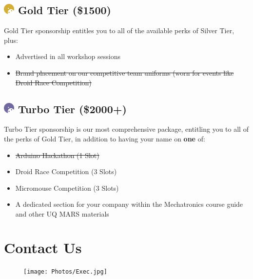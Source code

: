 \documentclass[a4paper,12pt]{report}
\begin{document}
\subsection*{
    \includegraphics[width=1em]{../assets/Sponsor Icons/Gold}
    \textcolor{sponsor_gold}{Gold Tier (\$1500)}
}
Gold Tier sponsorship entitles you to all of the available perks of Silver Tier, plus:
\begin{itemize}
    \item Advertised in all workshop sessions
    \item \st{Brand placement on our competitive team uniforms (worn for events like Droid Race Competition)}
\end{itemize}

\subsection*{
    \includegraphics[width=1em]{../assets/Sponsor Icons/Turbo.png}
    \textcolor{turbo_purple}{Turbo Tier (\$2000+)}
}
Turbo Tier sponsorship is our most comprehensive package, entitling you to all of the perks of Gold Tier, in addition to having your name on \textbf{one} of:
\begin{itemize}
    \item \st{Arduino Hackathon (1 Slot)}
    \item Droid Race Competition (3 Slots)
    \item Micromouse Competition (3 Slots)
    \item A dedicated section for your company within the Mechatronics course guide and other UQ MARS materials
\end{itemize}

\newpage

\section*{Contact Us}
\begin{figure}[H]
    \centering
    \texttt{[image: Photos/Exec.jpg]}
\end{figure}
\end{document}
